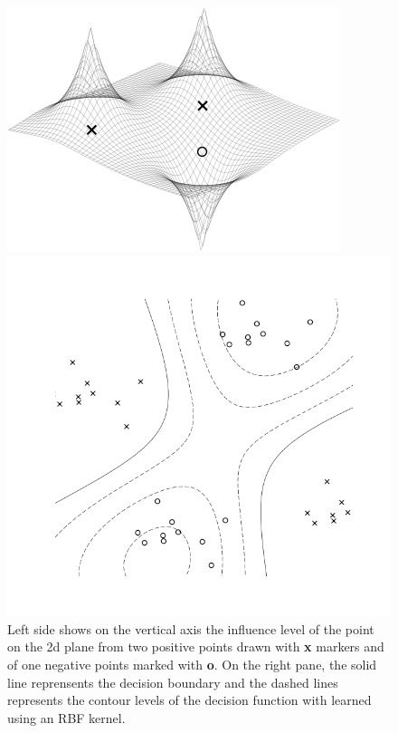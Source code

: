 \begin{figure}
  \begin{minipage}{.5\textwidth}
    \centering
    \includegraphics[width=\linewidth]{influence_map.png}
  \end{minipage}%
  \begin{minipage}{.5\textwidth}
    \centering
    \includegraphics[width=\linewidth]{decision_boundary.png}
  \end{minipage}
  \caption{
    Left side shows on the vertical axis the influence level of the point on the 2d plane from two positive points drawn  with \textbf{x} markers and of one negative points marked with \textbf{o}. On the right pane, the solid line reprensents the decision boundary and the dashed lines represents the contour levels of the decision function with learned using an RBF kernel.
  }
\end{figure}

